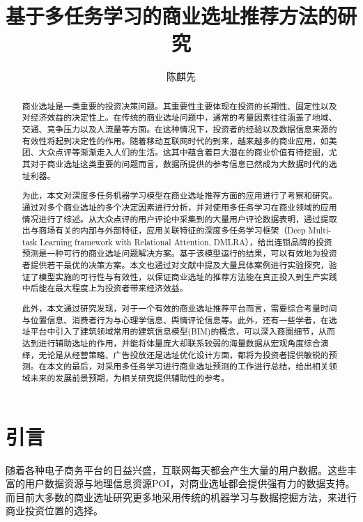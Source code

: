 \documentclass{llncs}
\begin{document}
	
\title{基于多任务学习的商业选址推荐方法的研究}
\author{陈麒先}
\maketitle

\begin{abstract}
商业选址是一类重要的投资决策问题。其重要性主要体现在投资的长期性、固定性以及对经济效益的决定性上。在传统的商业选址问题中，通常的考量因素往往涵盖了地域、交通、竞争压力以及人流量等方面。在这种情况下，投资者的经验以及数据信息来源的有效性将起到决定性的作用。随着移动互联网时代的到来，越来越多的商业应用，如美团、大众点评等渐渐走入人们的生活。这其中蕴含着巨大潜在的商业价值有待挖掘，尤其对于商业选址这类重要的问题而言，数据所提供的参考信息已然成为大数据时代的选址利器。

为此，本文对深度多任务机器学习模型在商业选址推荐方面的应用进行了考察和研究。通过对多个商业选址的多个决定因素进行分析，并对使用多任务学习在商业领域的应用情况进行了综述。从大众点评的用户评论中采集到的大量用户评论数据表明，通过提取出与商场有关的内部与外部特征，应用关联特征的深度多任务学习框架（Deep Multi-task Learning framework with Relational Attention, DMLRA），给出连锁品牌的投资预测是一种可行的商业选址问题解决方案。基于该模型运行的结果，可以有效地为投资者提供若干最优的决策方案。本文也通过对文献中提及大量具体案例进行实验探究，验证了模型实施的可行性与有效性，以保证商业选址的推荐方法能在真正投入到生产实践中后能在最大程度上为投资者带来经济效益。

此外，本文通过研究发现，对于一个有效的商业选址推荐平台而言，需要综合考量时间与位置信息、消费者行为与心理学信息、舆情评论信息等。此外，还有一些学者，在选址平台中引入了建筑领域常用的建筑信息模型(BIM)的概念，可以深入商圈细节，从而达到进行辅助选址的作用，并能将体量庞大却联系较弱的海量数据从宏观角度综合演绎，无论是从经营策略、广告投放还是选址优化设计方面，都将为投资者提供敏锐的预测。在本文的最后，对采用多任务学习进行商业选址预测的工作进行总结，给出相关领域未来的发展前景预期，为相关研究提供辅助性的参考。

\end{abstract}

\section{引言}
随着各种电子商务平台的日益兴盛，互联网每天都会产生大量的用户数据。这些丰富的用户数据资源与地理信息资源POI，对商业选址都会提供强有力的数据支持。而目前大多数的商业选址研究更多地采用传统的机器学习与数据挖掘方法，来进行商业投资位置的选择。
\end{document}
